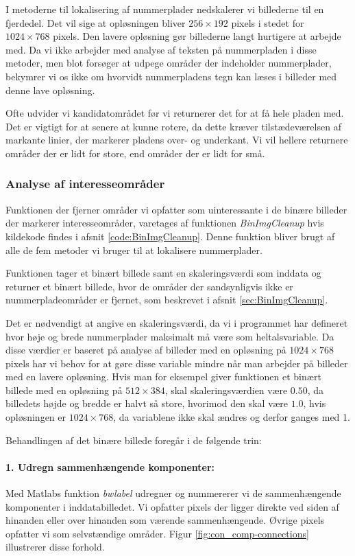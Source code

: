 I metoderne til lokalisering af nummerplader nedskalerer vi billederne til en fjerdedel. Det vil sige at opløsningen bliver $256 \times 192$ pixels i stedet for $1024 \times 768$ pixels. Den lavere opløsning gør billederne langt hurtigere at arbejde med. Da vi ikke arbejder med analyse af teksten på nummerpladen i disse metoder, men blot forsøger at udpege områder der indeholder nummerplader, bekymrer vi os ikke om hvorvidt nummerpladens tegn kan læses i billeder med denne lave opløsning.

Ofte udvider vi kandidatområdet før vi returnerer det for at få hele pladen med. Det er vigtigt for at senere at kunne rotere, da dette kræver tilstædeværelsen af markante linier, der markerer pladens over- og underkant. Vi vil hellere returnere områder der er lidt for store, end områder der er lidt for små.



\subsubsection{Analyse af interesseområder}
\label{sec:imp:BinImgCleanup}
Funktionen der fjerner områder vi opfatter som uinteressante i de binære billeder der markerer interesseområder, varetages af funktionen \textit{BinImgCleanup} hvis kildekode findes i afsnit \vref{code:BinImgCleanup}. Denne funktion bliver brugt af alle de fem metoder vi bruger til at lokalisere nummerplader.

Funktionen tager et binært billede samt en skaleringsværdi som inddata og returner et binært billede, hvor de områder der sandsynligvis ikke er nummerpladeområder er fjernet, som beskrevet i afsnit \vref{sec:BinImgCleanup}.

Det er nødvendigt at angive en skaleringsværdi, da vi i programmet har defineret hvor høje og brede nummerplader maksimalt må være som heltalsvariable. Da disse værdier er baseret på analyse af billeder med en opløsning på $1024 \times 768$ pixels har vi behov for at gøre disse variable mindre når man arbejder på billeder med en lavere opløsning. Hvis man for eksempel giver funktionen et binært billede med en opløsning på $512 \times 384$, skal skaleringsværdien være $0.50$, da billedets højde og bredde er halvt så store, hvorimod den skal være $1.0$, hvis opløsningen er $1024 \times 768$, da variablene ikke skal ændres og derfor ganges med 1.

Behandlingen af det binære billede foregår i de følgende trin:

\paragraph{1. Udregn sammenhængende komponenter:}
Med Matlabs funktion \textit{bwlabel} udregner og nummererer vi de sammenhængende komponenter i inddatabilledet. Vi opfatter pixels der ligger direkte ved siden af hinanden eller over hinanden som værende sammenhængende. Øvrige pixels opfatter vi som selvstændige områder. Figur \vref{fig:con_comp-connections} illustrerer disse forhold.

